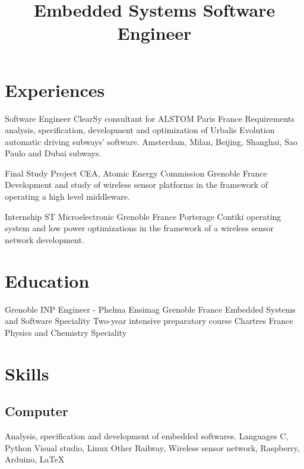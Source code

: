 \documentclass[10pt,a4paper]{moderncv}
\title{\large Embedded Systems Software Engineer}
\begin{document}
\maketitle

\section{Experiences}

	{Software Engineer}
	{ClearSy consultant for ALSTOM}
	{Paris}
	{France}
	{Requirements analysis, specification, development and optimization of Urbalis Evolution automatic driving subways' software.\newline{} Amsterdam, Milan, Beijing, Shanghai, Sao Paulo and Dubai subways.\newline{}}

	{Final Study Project}
	{CEA, Atomic Energy Commission}
	{Grenoble}
	{France}
	{Development and study of wireless sensor platforms in the framework of operating a high level middleware.\newline{}}

	{Internship}
	{ST Microelectronic}
	{Grenoble}
	{France}
	{Porterage Contiki operating system and low power optimizations in the framework of a wireless sensor network development.}

\section{Education}
	{Grenoble INP Engineer - Phelma Ensimag}
	{}
	{Grenoble}
	{France}
	{Embedded Systems and Software Speciality\newline{}}
	{Two-year intensive preparatory  course}
	{}
	{Chartres}
	{France}
	{Physics and Chemistry Speciality\newline{}}

\section{Skills}

	\subsection{Computer}

		{Analysis, specification and development of embedded softwares.\newline{}}
		{Languages}
		{C, Python}
		{Visual studio, Linux\newline{}}
		{Other}
		{Railway, Wireless sensor network, Raspberry, Arduino, \LaTeX} 
\end{document}
